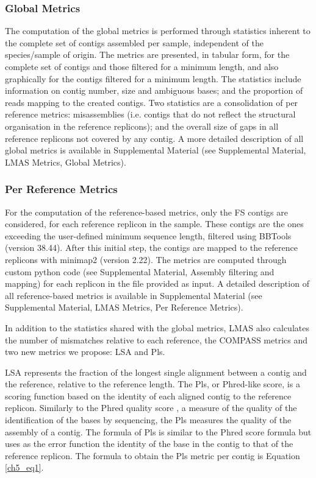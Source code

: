\subsubsection{Global Metrics} \label{sssec:_chap5_global_metrics} 

The computation of the global metrics is performed through statistics inherent to the complete set of contigs assembled per sample, independent of the species/sample of origin. The metrics are presented, in tabular form, for the complete set of contigs and those filtered for a minimum length, and also graphically for the contigs filtered for a minimum length. The statistics include information on contig number, size and ambiguous bases; and the proportion of reads mapping to the created contigs. Two statistics are a consolidation of per reference metrics: misassemblies (i.e. contigs that do not reflect the structural organisation in the reference replicons); and the overall size of gaps in all reference replicons not covered by any contig. A more detailed description of all global metrics is available in Supplemental Material (see Supplemental Material, LMAS Metrics, Global Metrics). 

\subsubsection{Per Reference Metrics} \label{sssec:_chap5_reference_metrics} 

For the computation of the reference-based metrics, only the \ac{FS} contigs are considered, for each reference replicon in the sample. These contigs are the ones exceeding the user-defined minimum sequence length, filtered using BBTools (version 38.44). After this initial step, the contigs are mapped to the reference replicons with minimap2 \cite{li_minimap2_2018} (version 2.22). The metrics are computed through custom python code (see Supplemental Material, Assembly filtering and mapping) for each replicon in the file provided as input. A detailed description of all reference-based metrics is available in Supplemental Material (see Supplemental Material, LMAS Metrics, Per Reference Metrics). 

In addition to the statistics shared with the global metrics, LMAS also calculates the number of mismatches relative to each reference, the COMPASS \cite{earl_assemblathon_2011} metrics and two new metrics we propose: \ac{LSA} and \ac{Pls}.

\ac{LSA} represents the fraction of the longest single alignment between a contig and the reference, relative to the reference length. The \ac{Pls}, or Phred-like score, is a scoring function based on the identity of each aligned contig to the reference replicon. Similarly to the Phred quality score \cite{ewing_base-calling_1998}, a measure of the quality of the identification of the bases by sequencing, the \ac{Pls} measures the quality of the assembly of a contig. The formula of \ac{Pls} is similar to the Phred score formula but uses as the error function the identity of the base in the contig to that of the reference replicon. The formula to obtain the \ac{Pls} metric per contig is Equation \ref{ch5_eq1}. 

